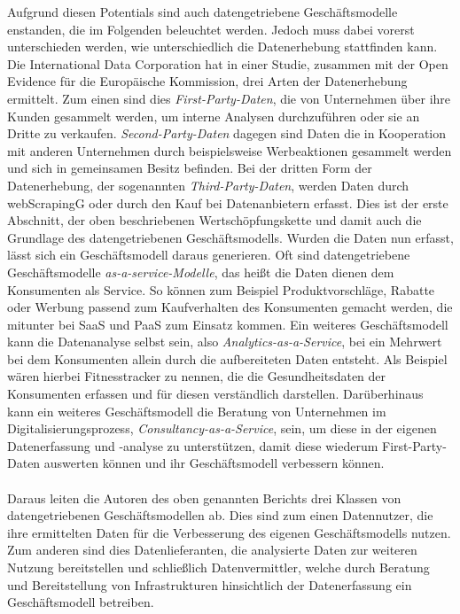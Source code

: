 \noindent Aufgrund diesen Potentials sind auch datengetriebene Geschäftsmodelle enstanden, die im Folgenden beleuchtet werden. Jedoch muss dabei vorerst unterschieden werden, wie unterschiedlich die Datenerhebung stattfinden kann. Die International Data Corporation hat in einer Studie, zusammen mit der Open Evidence für die Europäische Kommission, drei Arten der Datenerhebung ermittelt. Zum einen sind dies \textit{First-Party-Daten}, die von Unternehmen über ihre Kunden gesammelt werden, um interne Analysen durchzuführen oder sie an Dritte zu verkaufen. \textit{Second-Party-Daten} dagegen sind Daten die in Kooperation mit anderen Unternehmen durch beispielsweise Werbeaktionen gesammelt werden und sich in gemeinsamen Besitz befinden. Bei der dritten Form der Datenerhebung, der sogenannten \textit{Third-Party-Daten}, werden Daten durch \gls{webScrapingG} oder durch den Kauf bei Datenanbietern erfasst. Dies ist der erste Abschnitt, der oben beschriebenen Wertschöpfungskette und damit auch die Grundlage des datengetriebenen Geschäftsmodells. Wurden die Daten nun erfasst, lässt sich ein Geschäftsmodell daraus generieren. Oft sind datengetriebene Geschäftsmodelle \textit{\glqq as-a-service\grqq{}-Modelle}, das heißt die Daten dienen dem Konsumenten als Service. So können zum Beispiel Produktvorschläge, Rabatte oder Werbung passend zum Kaufverhalten des Konsumenten gemacht werden, die mitunter bei \gls{SaaS} und \gls{PaaS} zum Einsatz kommen. Ein weiteres Geschäftsmodell kann die Datenanalyse selbst sein, also \textit{Analytics-as-a-Service}, bei ein Mehrwert bei dem Konsumenten allein durch die aufbereiteten Daten entsteht. Als Beispiel wären hierbei Fitnesstracker zu nennen, die die Gesundheitsdaten der Konsumenten erfassen und für diesen verständlich darstellen. Darüberhinaus kann ein weiteres Geschäftsmodell die Beratung von Unternehmen im Digitalisierungsprozess, \textit{Consultancy-as-a-Service}, sein, um diese in der eigenen Datenerfassung und -analyse zu unterstützen, damit diese wiederum First-Party-Daten auswerten können und ihr Geschäftsmodell verbessern können.
\\
\\
\noindent Daraus leiten die Autoren des oben genannten Berichts drei Klassen von datengetriebenen Geschäftsmodellen ab. Dies sind zum einen Datennutzer, die ihre ermittelten Daten für die Verbesserung des eigenen Geschäftsmodells nutzen. Zum anderen sind dies Datenlieferanten, die analysierte Daten zur weiteren Nutzung bereitstellen und schließlich Datenvermittler, welche durch Beratung und Bereitstellung von Infrastrukturen hinsichtlich der Datenerfassung ein Geschäftsmodell betreiben. \cite{smart_2013}
